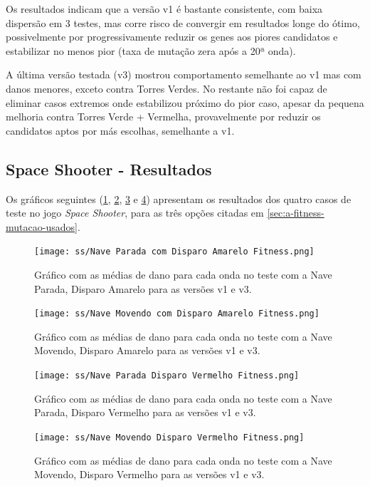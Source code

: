 Os resultados indicam que a versão v1 é bastante consistente, com baixa dispersão em 3 testes, mas corre risco de convergir em resultados longe do ótimo, possivelmente por progressivamente reduzir os genes aos piores candidatos e estabilizar no menos pior (taxa de mutação zera após a 20ª onda).

A última versão testada (v3) mostrou comportamento semelhante ao v1 mas com danos menores, exceto contra Torres Verdes. No restante não foi capaz de eliminar casos extremos onde estabilizou próximo do pior caso, apesar da pequena melhoria contra Torres Verde + Vermelha, provavelmente por reduzir os candidatos aptos por más escolhas, semelhante a v1.

\vfill
\pagebreak

\subsection{Space Shooter - Resultados}
\label{sec:ss-fit-res}

Os gráficos seguintes (\ref{fig:fit-ss-ys}, \ref{fig:fit-ss-ym}, \ref{fig:fit-ss-rs} e \ref{fig:fit-ss-rm}) apresentam os resultados dos quatro casos de teste no jogo \textit{Space Shooter}, para as três opções citadas em \ref{sec:a-fitness-mutacao-usados}.

\begin{figure}[H]
  \centering
  \texttt{[image: ss/Nave Parada com Disparo Amarelo Fitness.png]}
  \caption{Gráfico com as médias de dano para cada onda no teste com a Nave Parada, Disparo Amarelo para as versões v1 e v3.}
  \label{fig:fit-ss-ys}
\end{figure}

\begin{figure}[H]
  \centering
  \texttt{[image: ss/Nave Movendo com Disparo Amarelo Fitness.png]}
  \caption{Gráfico com as médias de dano para cada onda no teste com a Nave Movendo, Disparo Amarelo para as versões v1 e v3.}
  \label{fig:fit-ss-ym}
\end{figure}

\begin{figure}[H]
  \centering
  \texttt{[image: ss/Nave Parada Disparo Vermelho Fitness.png]}
  \caption{Gráfico com as médias de dano para cada onda no teste com a Nave Parada, Disparo Vermelho para as versões v1 e v3.}
  \label{fig:fit-ss-rs}
\end{figure}

\begin{figure}[H]
  \centering
  \texttt{[image: ss/Nave Movendo Disparo Vermelho Fitness.png]}
  \caption{Gráfico com as médias de dano para cada onda no teste com a Nave Movendo, Disparo Vermelho para as versões v1 e v3.}
  \label{fig:fit-ss-rm}
\end{figure}




